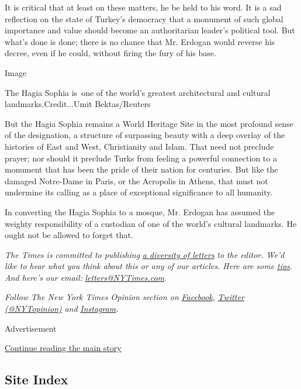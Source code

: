 It is critical that at least on these matters, he be held to his word.
It is a sad reflection on the state of Turkey's democracy that a
monument of such global importance and value should become an
authoritarian leader's political tool. But what's done is done; there is
no chance that Mr. Erdogan would reverse his decree, even if he could,
without firing the fury of his base.

Image

The Hagia Sophia is~one of the world's greatest architectural and
cultural landmarks.Credit...Umit Bektas/Reuters

But the Hagia Sophia remains a World Heritage Site in the most profound
sense of the designation, a structure of surpassing beauty with a deep
overlay of the histories of East and West, Christianity and Islam. That
need not preclude prayer; nor should it preclude Turks from feeling a
powerful connection to a monument that has been the pride of their
nation for centuries. But like the damaged Notre-Dame in Paris, or the
Acropolis in Athens, that must not undermine its calling as a place of
exceptional significance to all humanity.

In converting the Hagia Sophia to a mosque, Mr. Erdogan has assumed the
weighty responsibility of a custodian of one of the world's cultural
landmarks. He ought not be allowed to forget that.

\emph{The Times is committed to publishing}
\href{https://www.nytimes3xbfgragh.onion/2019/01/31/opinion/letters/letters-to-editor-new-york-times-women.html}{\emph{a
diversity of letters}} \emph{to the editor. We'd like to hear what you
think about this or any of our articles. Here are some}
\href{https://help.nytimes3xbfgragh.onion/hc/en-us/articles/115014925288-How-to-submit-a-letter-to-the-editor}{\emph{tips}}\emph{.
And here's our email:}
\href{mailto:letters@NYTimes.com}{\emph{letters@NYTimes.com}}\emph{.}

\emph{Follow The New York Times Opinion section on}
\href{https://www.facebookcorewwwi.onion/nytopinion}{\emph{Facebook}}\emph{,}
\href{http://twitter.com/NYTOpinion}{\emph{Twitter (@NYTopinion)}}
\emph{and}
\href{https://www.instagram.com/nytopinion/}{\emph{Instagram}}\emph{.}

Advertisement

\protect\hyperlink{after-bottom}{Continue reading the main story}

\hypertarget{site-index}{%
\subsection{Site Index}\label{site-index}}

